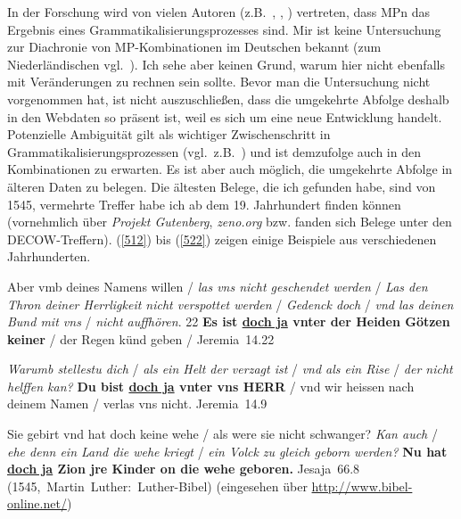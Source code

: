 In der Forschung wird von vielen Autoren (z.B.\ \citealt{Abraham1991b}, \citealt{Diewald1997}, \citealt{Wegener2002}) vertreten, dass MPn das Ergebnis eines Grammatikalisierungspro\-zesses sind. Mir ist keine Untersuchung zur Diachronie von MP-Kom\-bi\-na\-ti\-on\-en im Deutschen bekannt (zum Niederländischen vgl.\ \citealt{Hoeksema2008}). Ich sehe aber keinen Grund, warum hier nicht ebenfalls mit Veränderungen zu rechnen sein sollte. Bevor man die Untersuchung nicht vorgenommen hat, ist nicht auszu\-schließen, dass die umgekehrte Abfolge deshalb in den Webdaten so präsent ist, weil es sich um eine neue Entwicklung handelt. Potenzielle Ambiguität  gilt als wichtiger Zwischenschritt in  Grammatikalisierungsprozessen (vgl.\ z.B.\ \citealt[137--138, 141, 144]{Diewald2008})  und ist demzufolge auch in den Kombinationen zu erwarten. Es ist aber auch möglich, die umgekehrte Abfolge in älteren Daten zu belegen. Die ältesten Belege, die ich gefunden habe, sind von 1545, vermehrte Tref\-fer habe ich ab dem 19. Jahrhundert finden können (vornehmlich über \textit{Projekt Gutenberg}, \textit{zeno.org} bzw. fanden sich Belege unter den DECOW-Treffern). (\ref{512}) bis (\ref{522}) zeigen einige Beispiele aus verschiedenen Jahrhunderten.

\begin{exe}
	\ex\label{512} 

	Aber vmb deines Namens willen / \emph{las vns nicht geschendet werden} / \emph{Las den Thron deiner Herrligkeit nicht verspottet 			werden} / \emph{Gedenck doch} / \emph{vnd las deinen Bund mit vns} / \emph{nicht auffhören}. 22 \textbf{Es ist \underline{doch ja} vnter der Heiden Götzen keiner} / der Regen künd geben / 
	\hfill\hbox{Jeremia 14.22}
\end{exe}	

\begin{exe}
	\ex\label{513} 

	\emph{Warumb stellestu dich} / \emph{als ein Helt der verzagt ist} / \emph{vnd als ein Rise} / \emph{der nicht 						helffen kan?} \textbf{Du bist \underline{doch ja} vnter vns HERR} / vnd wir heissen nach deinem Namen / verlas vns nicht. 
	\hfill\hbox{Jeremia 14.9}
\end{exe}	

\begin{exe}
	\ex\label{514} 

	Sie gebirt vnd hat doch keine wehe / als were sie nicht schwanger? \emph{Kan auch} / \emph{ehe denn ein Land die wehe kriegt} / 			\emph{ein Volck zu gleich geborn werden?} \textbf{Nu hat \underline{doch ja} Zion jre Kinder on die wehe geboren.} 
	\hfill\hbox{Jesaja 66.8}	\\
	\hbox{}\hfill\hbox{(1545, Martin Luther: Luther-Bibel)}
	\newline
	\hbox{}\hfill{\scriptsize(eingesehen über \url{http://www.bibel-online.net/})}
\end{exe}
	
